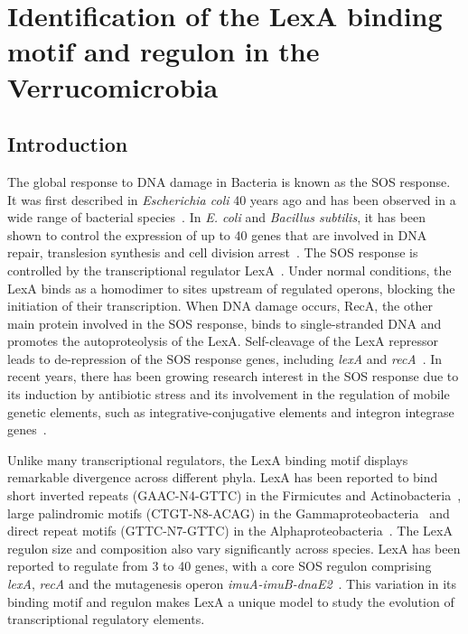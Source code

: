 \chapter{Identification of the LexA binding motif and regulon in the
  Verrucomicrobia}
\label{chap:verrucomicrobia}

\section{Introduction}

The global response to DNA damage in Bacteria is known as the SOS response. It
was first described in \textit{Escherichia coli} 40 years ago and has been
observed in a wide range of bacterial species~\citep{radman1975sos,
  little1982sos, erill2007aeons}. In \textit{E. coli} and \textit{Bacillus
  subtilis}, it has been shown to control the expression of up to 40 genes that
are involved in DNA repair, translesion synthesis and cell division
arrest~\citep{au2005genetic, fernandez2000identification, walker2000sos}. The
SOS response is controlled by the transcriptional regulator
LexA~\citep{michel2005after}. Under normal conditions, the LexA binds as a
homodimer to sites upstream of regulated operons, blocking the initiation of
their transcription. When DNA damage occurs, RecA, the other main protein
involved in the SOS response, binds to single-stranded DNA and promotes the
autoproteolysis of the LexA. Self-cleavage of the LexA repressor leads to
de-repression of the SOS response genes, including \textit{lexA} and
\textit{recA}~\citep{little1991mechanism}. In recent years, there has been
growing research interest in the SOS response due to its induction by antibiotic stress
and its involvement in the regulation of mobile genetic elements, such as
integrative-conjugative elements and integron integrase genes~\citep{beaber2004sos,
  guerin2009sos}.

Unlike many transcriptional regulators, the LexA binding motif displays remarkable
divergence across different phyla. LexA has been reported to bind short
inverted repeats (GAAC-N4-GTTC) in the Firmicutes and
Actinobacteria~\citep{au2005genetic, davis2002definition}, large palindromic
motifs (CTGT-N8-ACAG) in the Gammaproteobacteria~\citep{erill2003silico,
  fernandez2000identification} and direct repeat motifs (GTTC-N7-GTTC) in the
Alphaproteobacteria~\citep{erill2004differences,
  fernandez1998identification}. The LexA regulon size and composition also vary
significantly across species. LexA has been reported to regulate from 3 to 40
genes, with a core SOS regulon comprising \textit{lexA}, \textit{recA} and the
mutagenesis operon \textit{imuA-imuB-dnaE2}~\citep{erill2006dispersal}. This
variation in its binding motif and
regulon makes LexA a unique model to study the evolution of transcriptional
regulatory elements.

